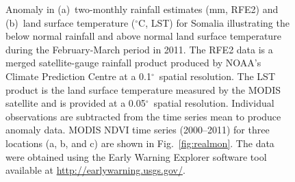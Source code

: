 \documentclass[authoryear,preprint,review,10pt]{elsarticle}
\newcommand{\degree}{\ensuremath{^\circ}}
\begin{document}
\begin{figure} [htp]
\centering
{} 
 \caption{Anomaly in (a)~two-monthly rainfall estimates (mm, RFE2) and (b)~land surface temperature (\degree C, LST) for
   Somalia illustrating the below normal rainfall and above normal land surface temperature during the February-March period in 2011.
   The RFE2 data is a merged satellite-gauge rainfall product produced by NOAA's Climate Prediction Centre at a 0.1\degree~spatial resolution.
   The LST product is the land surface temperature measured by the MODIS satellite and is provided at a 0.05\degree~spatial resolution.
   Individual observations are subtracted from the time series mean to produce anomaly data. MODIS NDVI time series (2000--2011) for
   three locations (a, b, and c) are shown in Fig.~\ref{fig:realmon}. The data were obtained using the Early Warning Explorer software tool
   available at \url{http://earlywarning.usgs.gov/}. }
 \label{fig:RF_LSTSomalia}
\end{figure}
\end{document}
